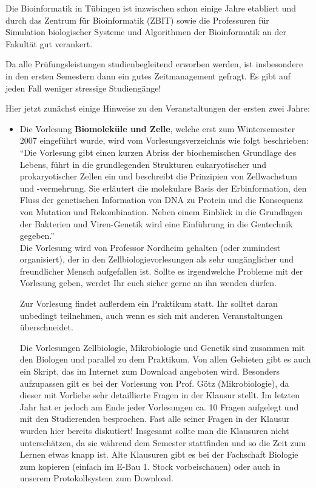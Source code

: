 
Die Bioinformatik in Tübingen ist inzwischen schon einige Jahre etabliert
und durch das Zentrum für Bioinformatik (ZBIT) sowie die Professuren für Simulation
biologischer Systeme und Algorithmen der Bioinformatik an der Fakultät gut verankert.

Da alle Prüfungsleistungen studienbegleitend erworben werden, ist insbesondere in den ersten Semestern dann ein gutes Zeitmanagement gefragt. Es gibt auf jeden Fall weniger stressige Studiengänge!

Hier jetzt zunächst einige Hinweise zu den Veranstaltungen der ersten zwei Jahre:

\begin{itemize}

\item Die Vorlesung \textbf{Biomoleküle und Zelle}, welche erst zum Wintersemester 2007 eingeführt wurde, wird vom Vorlesungsverzeichnis wie folgt beschrieben:\\
"`Die Vorlesung gibt einen kurzen Abriss der biochemischen Grundlage des Lebens, führt in die grundlegenden Strukturen eukaryotischer und prokaryotischer Zellen ein und
beschreibt die Prinzipien von Zellwachstum und -vermehrung. Sie erläutert die molekulare Basis der Erbinformation, den Fluss der genetischen Information von DNA zu Protein
und die Konsequenz von Mutation und Rekombination. Neben einem Einblick in die Grundlagen der Bakterien und Viren-Genetik wird eine Einführung in die Gentechnik gegeben."'\\
Die Vorlesung wird von Professor Nordheim gehalten (oder zumindest organisiert), der in den Zellbiologievorlesungen als sehr umgänglicher und freundlicher Mensch aufgefallen ist.
Sollte es irgendwelche Probleme mit der Vorlesung geben, werdet Ihr euch sicher gerne an ihn wenden dürfen.

Zur Vorlesung findet außerdem ein Praktikum statt. Ihr solltet daran unbedingt teilnehmen, auch wenn es sich mit anderen Veranstaltungen überschneidet.

     Die Vorlesungen Zellbiologie, Mikrobiologie und Genetik sind zusammen mit den Biologen und
     parallel zu dem Praktikum. Von allen Gebieten gibt es auch ein Skript, das im Internet zum Download angeboten wird.
     Besonders aufzupassen gilt es bei der Vorlesung von Prof. Götz (Mikrobiologie), da
     dieser mit Vorliebe sehr detaillierte Fragen in der Klausur stellt. Im letzten Jahr hat er jedoch
     am Ende jeder Vorlesungen ca. 10 Fragen aufgelegt und mit den Studierenden besprochen.
     Fast alle seiner Fragen in der Klausur wurden hier bereits diskutiert!
     Insgesamt sollte man die Klausuren nicht unterschätzen, da sie während
     dem Semester stattfinden und so die Zeit zum Lernen etwas knapp ist. Alte Klausuren gibt es bei der
     Fachschaft Biologie zum kopieren (einfach im E-Bau 1. Stock vorbeischauen) oder auch in unserem Protokollsystem zum Download.


\end{itemize}

